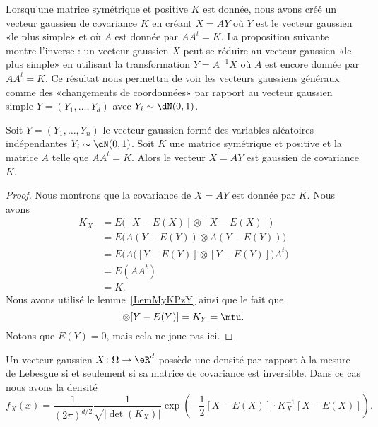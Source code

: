 Lorsqu'une matrice symétrique et positive \( K\) est donnée, nous avons créé un vecteur gaussien de covariance \( K\) en créant \( X=AY\) où \( Y\) est le vecteur gaussien «le plus simple» et où \( A\) est donnée par \( AA^t=K\). La proposition suivante montre l'inverse : un vecteur gaussien \( X\) peut se réduire au vecteur gaussien «le plus simple» en utilisant la transformation \( Y=A^{-1}X\) où \( A\) est encore donnée par \( AA^t=K\). Ce résultat nous permettra de voir les vecteurs gaussiens généraux comme des «changements de coordonnées» par rapport au vecteur gaussien simple \( Y=(Y_1,\ldots, Y_d)\) avec \( Y_i\sim\dN(0,1)\).

\begin{proposition} \label{PropGacmRi}
	Soit \( Y=(Y_1,\ldots, Y_n)\) le vecteur gaussien formé des variables aléatoires indépendantes \( Y_i\sim\dN(0,1)\). Soit \( K\) une matrice symétrique et positive et la matrice \( A\) telle que \( AA^t=K\). Alors le vecteur \( X=AY\) est gaussien de covariance \( K\).
\end{proposition}

\begin{proof}
	Nous montrons que la covariance de \( X=AY\) est donnée par \( K\). Nous avons
	\begin{subequations}
		\begin{align}
			K_X & =E\big( [X-E(X)]\otimes [X-E(X)] \big)                 \\
			    & =E\big( A(Y-E(Y))\otimes A(Y-E(Y)) \big)               \\
			    & =E\Big( A\big( [Y-E(Y)]\otimes [Y-E(Y)] \big)A^t \Big) \\
			    & =E(AA^t)                                               \\
			    & =K.
		\end{align}
	\end{subequations}
	Nous avons utilisé le lemme~\ref{LemMyKPzY} ainsi que le fait que
	\begin{equation}
		[Y-E(Y)]\otimes [Y-E(Y)]=K_Y=\mtu.
	\end{equation}
	Notons que \( E(Y)=0\), mais cela ne joue pas ici.
\end{proof}

\begin{theorem}
	Un vecteur gaussien \( X\colon \Omega\to \eR^d\) possède une densité par rapport à la mesure de Lebesgue si et seulement si sa matrice de covariance est inversible. Dans ce cas nous avons la densité
	\begin{equation}        \label{EqzulwmY}
		f_X(x)=\frac{1}{ (2\pi)^{d/2} }\frac{1}{ \sqrt{| \det(K_X) |} }\exp\left( -\frac{ 1 }{2}[X-E(X)]\cdot K_X^{-1}[X-E(X)] \right).
	\end{equation}
\end{theorem}


